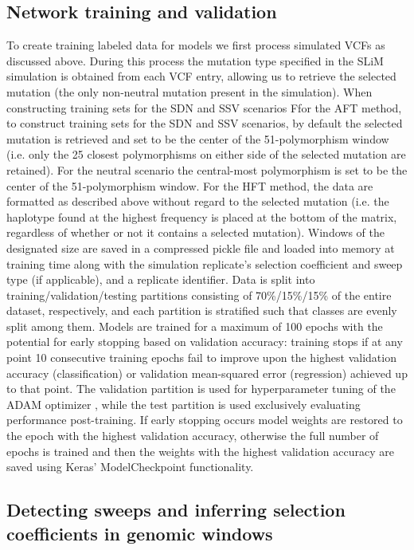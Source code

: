 \subsection{Network training and validation}

To create training labeled data for models we first process simulated VCFs as discussed above. During this process the mutation type specified in the SLiM simulation is obtained from each VCF entry, allowing us to retrieve the selected mutation (the only non-neutral mutation present in the simulation). When constructing training sets for the SDN and SSV scenarios Ffor the AFT method, to construct training sets for the SDN and SSV scenarios, by default the selected mutation is retrieved and set to be the center of the 51-polymorphism window (i.e. only the 25 closest polymorphisms on either side of the selected mutation are retained). For the neutral scenario the central-most polymorphism is set to be the center of the 51-polymorphism window. For the HFT method, the data are formatted as described above without regard to the selected mutation (i.e. the haplotype found at the highest frequency is placed at the bottom of the matrix, regardless of whether or not it contains a selected mutation). Windows of the designated size are saved in a compressed pickle file and loaded into memory at training time along with the simulation replicate’s selection coefficient and sweep type (if applicable), and a replicate identifier. 
Data is split into training/validation/testing partitions consisting of 70\%/15\%/15\% of the entire dataset, respectively, and each partition is stratified such that classes are evenly split among them. Models are trained for a maximum of 100 epochs with the potential for early stopping based on validation accuracy: training stops if at any point 10 consecutive training epochs fail to improve upon the highest validation accuracy (classification) or validation mean-squared error (regression) achieved up to that point. The validation partition is used for hyperparameter tuning of the ADAM optimizer \cite{kingmaAdamMethodStochastic2017}, while the test partition is used exclusively evaluating performance post-training. If early stopping occurs model weights are restored to the epoch with the highest validation accuracy, otherwise the full number of epochs is trained and then the weights with the highest validation accuracy are saved using Keras’ ModelCheckpoint functionality. \\

\subsection{Detecting sweeps and inferring selection coefficients in genomic windows}

